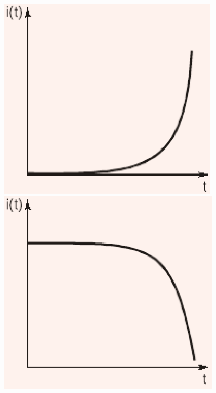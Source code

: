 \documentclass[journal,12pt,twocolumn]{IEEEtran}
\begin{document}
\begin{enumerate}
\begin{figure}[!h]
\begin{center}
\includegraphics[scale=0.4]{./figs/fig93c.eps}
\includegraphics[scale=0.4]{./figs/fig93d.eps}
\caption{}
\label{fig93}
\end{center}
\end{figure}


\end{enumerate}
\end{document}
